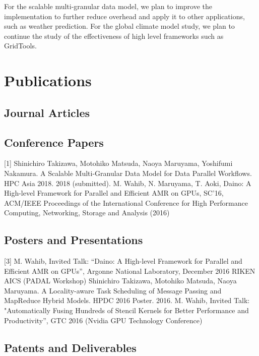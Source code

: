 \documentclass{book}
\begin{document}
For the scalable multi-granular data model, we plan to improve the implementation to further reduce overhead and apply it to other applications, such as weather prediction. For the global climate model study, we plan to continue the study of the effectiveness of high level frameworks such as GridTools.


\section{Publications}

\subsection{Journal Articles}

\subsection{Conference Papers}

[1] Shinichiro Takizawa, Motohiko Matsuda, Naoya Maruyama, Yoshifumi Nakamura. A Scalable Multi-Granular Data Model for Data Parallel Workflows. HPC Asia 2018. 2018 (submitted). \newline
[2] M. Wahib, N. Maruyama, T. Aoki, Daino: A High-level Framework for Parallel and Efficient AMR on GPUs, SC'16, ACM/IEEE Proceedings of the International Conference for High Performance Computing, Networking, Storage and Analysis (2016) \newline

\subsection{Posters and Presentations}
[3] M. Wahib, Invited Talk: “Daino: A High-level Framework for Parallel and Efficient AMR on GPUs”, Argonne National Laboratory, December 2016
RIKEN AICS (PADAL Workshop) \newline
[4] Shinichiro Takizawa, Motohiko Matsuda, Naoya Maruyama. A Locality-aware Task Scheduling of Message Passing and MapReduce Hybrid Models. HPDC 2016 Poster. 2016. \newline
[5] M. Wahib, Invited Talk: "Automatically Fusing Hundreds of Stencil Kernels for Better Performance and Productivity”, GTC 2016 (Nvidia GPU Technology Conference) \newline

\subsection{Patents and Deliverables}
\end{document}
